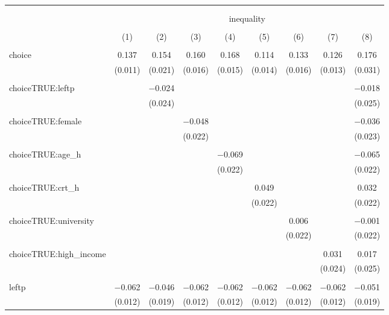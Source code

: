 
\begin{table}[!htbp] \centering 
  \caption{} 
  \label{} 
\begin{tabular}{@{\extracolsep{5pt}}lcccccccc} 
\\[-1.8ex]\hline 
\hline \\[-1.8ex] 
\\[-1.8ex] & \multicolumn{8}{c}{inequality} \\ 
\\[-1.8ex] & (1) & (2) & (3) & (4) & (5) & (6) & (7) & (8)\\ 
\hline \\[-1.8ex] 
 choice & 0.137 & 0.154 & 0.160 & 0.168 & 0.114 & 0.133 & 0.126 & 0.176 \\ 
  & (0.011) & (0.021) & (0.016) & (0.015) & (0.014) & (0.016) & (0.013) & (0.031) \\ 
  & & & & & & & & \\ 
 choiceTRUE:leftp &  & $-$0.024 &  &  &  &  &  & $-$0.018 \\ 
  &  & (0.024) &  &  &  &  &  & (0.025) \\ 
  & & & & & & & & \\ 
 choiceTRUE:female &  &  & $-$0.048 &  &  &  &  & $-$0.036 \\ 
  &  &  & (0.022) &  &  &  &  & (0.023) \\ 
  & & & & & & & & \\ 
 choiceTRUE:age\_h &  &  &  & $-$0.069 &  &  &  & $-$0.065 \\ 
  &  &  &  & (0.022) &  &  &  & (0.022) \\ 
  & & & & & & & & \\ 
 choiceTRUE:crt\_h &  &  &  &  & 0.049 &  &  & 0.032 \\ 
  &  &  &  &  & (0.022) &  &  & (0.022) \\ 
  & & & & & & & & \\ 
 choiceTRUE:university &  &  &  &  &  & 0.006 &  & $-$0.001 \\ 
  &  &  &  &  &  & (0.022) &  & (0.022) \\ 
  & & & & & & & & \\ 
 choiceTRUE:high\_income &  &  &  &  &  &  & 0.031 & 0.017 \\ 
  &  &  &  &  &  &  & (0.024) & (0.025) \\ 
  & & & & & & & & \\ 
 leftp & $-$0.062 & $-$0.046 & $-$0.062 & $-$0.062 & $-$0.062 & $-$0.062 & $-$0.062 & $-$0.051 \\ 
  & (0.012) & (0.019) & (0.012) & (0.012) & (0.012) & (0.012) & (0.012) & (0.019) \\ 

\end{tabular}
\end{table}
